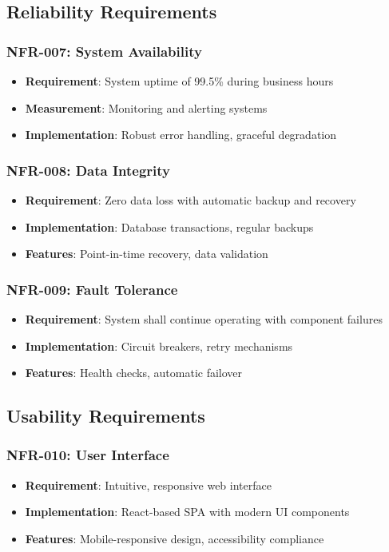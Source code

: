 \documentclass[12pt,a4paper]{article}
\begin{document}
\subsection{Reliability Requirements}

\subsubsection{NFR-007: System Availability}
\begin{itemize}
    \item \textbf{Requirement}: System uptime of 99.5\% during business hours
    \item \textbf{Measurement}: Monitoring and alerting systems
    \item \textbf{Implementation}: Robust error handling, graceful degradation
\end{itemize}

\subsubsection{NFR-008: Data Integrity}
\begin{itemize}
    \item \textbf{Requirement}: Zero data loss with automatic backup and recovery
    \item \textbf{Implementation}: Database transactions, regular backups
    \item \textbf{Features}: Point-in-time recovery, data validation
\end{itemize}

\subsubsection{NFR-009: Fault Tolerance}
\begin{itemize}
    \item \textbf{Requirement}: System shall continue operating with component failures
    \item \textbf{Implementation}: Circuit breakers, retry mechanisms
    \item \textbf{Features}: Health checks, automatic failover
\end{itemize}

\subsection{Usability Requirements}

\subsubsection{NFR-010: User Interface}
\begin{itemize}
    \item \textbf{Requirement}: Intuitive, responsive web interface
    \item \textbf{Implementation}: React-based SPA with modern UI components
    \item \textbf{Features}: Mobile-responsive design, accessibility compliance
\end{itemize}
\end{document}
